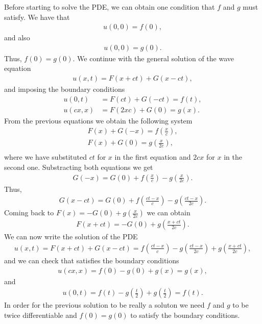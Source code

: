 \begin{questions}

\begin{solution}
Before starting to solve the PDE, we can obtain one condition that $f$ and $g$ must satisfy. We have that
\begin{align*}
u(0,0)=f(0),
\end{align*}
and also
\begin{align*}
u(0,0)=g(0).
\end{align*}
Thus, $f(0)=g(0)$. We continue with the general solution of the wave equation
\begin{align*}
u(x,t)=F(x+ct)+G(x-ct),
\end{align*}
and imposing the boundary conditions
\begin{align*}
u(0,t)&=F(ct)+G(-ct)=f(t),\\
u(cx,x)&=F(2xc)+G(0)=g(x).
\end{align*}
From the previous equations we obtain the following system
\begin{align*}
F(x)+G(-x)=f\left(\frac{x}{c}\right),\\
F(x)+G(0)=g\left(\frac{x}{2c}\right),\\
\end{align*}
where we have substituted $ct$ for $x$ in the first equation and $2cx$ for $x$ in the second one. Substracting both equations we get
\begin{align*}
G(-x)=G(0)+f\left(\frac{x}{c}\right)-g\left(\frac{x}{2c}\right).
\end{align*}
Thus,
\begin{align*}
G(x-ct)=G(0)+f\left(\frac{ct-x}{c}\right)-g\left(\frac{ct-x}{2c}\right).
\end{align*}
Coming back to $F(x)=-G(0)+g\left(\frac{x}{2c}\right)$ we can obtain
\begin{align*}
F(x+ct)=-G(0)+g\left(\frac{x+ct}{2c}\right).
\end{align*}
We can now write the solution of the PDE
\begin{align*}
u(x,t)=F(x+ct)+G(x-ct)=f\left(\frac{ct-x}{c}\right)-g\left(\frac{ct-x}{2c}\right)+g\left(\frac{x+ct}{2c}\right),
\end{align*}
and we can check that satisfies the boundary conditions
\begin{align*}
u(cx,x)=f(0)-g\left(0\right)+g\left(x\right)=g(x),
\end{align*}
and
\begin{align*}
u(0,t)=f(t)-g\left(\frac{t}{2}\right)+g\left(\frac{t}{2}\right)=f(t).
\end{align*}
In order for the previous solution to be really a soluton we need $f$ and $g$ to be twice differentiable and $f(0)=g(0)$ to satisfy the boundary conditions.
\end{solution}

\end{questions}
